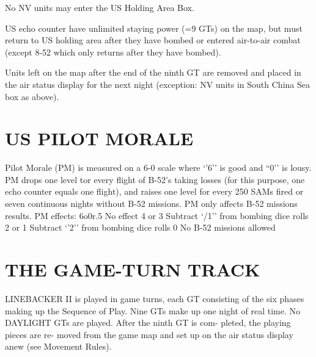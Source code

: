 No NV units may enter the US
Holding Area Box.

US echo counter have unlimited
staying power (=9 GTs) on the map,
but must return to US holding area
after they have bombed or entered
air-to-air combat (except 8-52 which
only returns after they have bombed).

Units left on the map after the end
of the ninth GT are removed and
placed in the air status display for
the next night (exception: NV units in
South China Sea box as above).

\section*{US PILOT MORALE}
Pilot Morale (PM) is measured on a
6-0 scale where ‘’6’’ is good and
“0’’ is lousy. PM drops one level tor
every flight of B-52’s taking losses
(for this purpose, one echo counter
equals one flight), and raises one
level for every 250 SAMs fired or
seven continuous nights without B-52
missions. PM only affects B-52
missions results.
PM effects:
6o0r.5 No effect
4 or 3 Subtract ‘/1’’ from bombing
dice rolls
2 or 1 Subtract ‘’2’’ from bombing
dice rolls
0 No B-52 missions allowed

\section*{THE GAME-TURN TRACK}
LINEBACKER II is played in game
turns, each GT consisting of the six
phases making up the Sequence of
Play. Nine GTs make up one night of
real time. No DAYLIGHT GTs are
played. After the ninth GT is com-
pleted, the playing pieces are re-
moved from the game map and set up
on the air status display anew (see
Movement Rules).

\newpage

